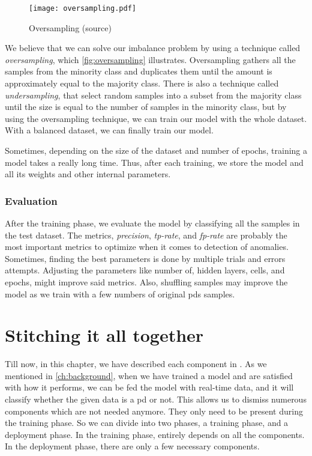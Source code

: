 \begin{figure}[ht]
    \centering
    \texttt{[image: oversampling.pdf]}
    \caption[Oversampling dataset]{Oversampling (source\cite{tw_imbalance})}
    \label{fig:oversampling}
\end{figure}

We believe that we can solve our imbalance problem by using a technique called \emph{oversampling}, which \autoref{fig:oversampling} illustrates. Oversampling gathers all the samples from the minority class and duplicates them until the amount is approximately equal to the majority class. There is also a technique called \emph{undersampling}, that select random samples into a subset from the majority class until the size is equal to the number of samples in the minority class, but by using the oversampling technique, we can train our model with the whole dataset. With a balanced dataset, we can finally train our model.

Sometimes, depending on the size of the dataset and number of epochs, training a model takes a really long time. Thus, after each training, we store the model and all its weights and other internal parameters.

\subsubsection{Evaluation}
After the training phase, we evaluate the model by classifying all the samples in the test dataset. The metrics, \emph{precision}, \emph{tp-rate}, and \emph{fp-rate} are probably the most important metrics to optimize when it comes to detection of anomalies. Sometimes, finding the best parameters is done by multiple trials and errors attempts. Adjusting the parameters like number of, hidden layers, cells, and epochs, might improve said metrics. Also, shuffling samples may improve the model as we train with a few numbers of original \acp{pd} samples.

\section{Stitching it all together}
Till now, in this chapter, we have described each component in \project. As we mentioned in \autoref{ch:background}, when we have trained a model and are satisfied with how it performs, we can be fed the model with real-time data, and it will classify whether the given data is a \ac{pd} or not. This allows us to dismiss numerous components which are not needed anymore. They only need to be present during the training phase. So we can divide \project into two phases, a training phase, and a deployment phase. In the training phase, \project entirely depends on all the components. In the deployment phase, there are only a few necessary components.

